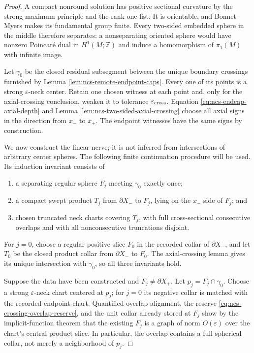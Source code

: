\documentclass[10pt]{coll-l}
\theoremstyle{definition}
\theoremstyle{remark}
\numberwithin{section}{chapter}
\numberwithin{equation}{chapter}
\begin{document}
\begin{proof}
A compact nonround solution has positive sectional curvature by the strong
maximum principle and the rank-one list.  It is orientable, and
Bonnet--Myers makes its fundamental group finite.  Every two-sided
embedded sphere in the middle therefore separates: a nonseparating
oriented sphere would have nonzero Poincar\'e dual in
$H^1(M;\mathbb Z)$ and induce a homomorphism of $\pi_1(M)$ with infinite
image.

Let $\gamma_0$ be the closed residual subsegment between the unique
boundary crossings furnished by Lemma
\ref{lem:ncs-remote-endpoint-caps}.  Every one of its points is a strong
$\varepsilon$-neck center.  Retain one chosen witness at each point and,
only for the axial-crossing conclusion, weaken it to tolerance
$\varepsilon_{\rm cross}$.  Equation
\eqref{eq:ncs-endcap-axial-depth} and Lemma
\ref{lem:ncs-two-sided-axial-crossing} choose all axial signs in the
direction from $x_-$ to $x_+$.  The endpoint witnesses have the same signs
by construction.

We now construct the linear nerve; it is not inferred from intersections
of arbitrary center spheres.  The following finite continuation procedure
will be used.  Its induction invariant consists of
\begin{enumerate}
\item a separating regular sphere $F_j$ meeting $\gamma_0$ exactly once;
\item a compact swept product $T_j$ from $\partial X_-$ to $F_j$, lying
      on the $x_-$ side of $F_j$; and
\item chosen truncated neck charts covering $T_j$, with full
      cross-sectional consecutive overlaps and with all nonconsecutive
      truncations disjoint.
\end{enumerate}
For $j=0$, choose a regular positive slice $F_0$ in the recorded collar of
$\partial X_-$, and let $T_0$ be the closed product collar from
$\partial X_-$ to $F_0$.  The axial-crossing lemma gives its unique
intersection with $\gamma_0$, so all three invariants hold.

Suppose the data have been constructed and $F_j\ne\partial X_+$.  Let
$p_j=F_j\cap\gamma_0$.  Choose a strong $\varepsilon$-neck chart centered
at $p_j$; for $j=0$ its negative collar is matched with the recorded
endpoint chart.  Quantified overlap
alignment, the reserve
\eqref{eq:ncs-crossing-overlap-reserve}, and the unit collar already stored
at $F_j$ show by the implicit-function theorem that the existing $F_j$ is a graph of norm
$O(\varepsilon)$ over the chart's central product slice.  In particular,
the overlap contains a full spherical collar, not merely a neighborhood
of $p_j$.


\end{proof}
\end{document}
